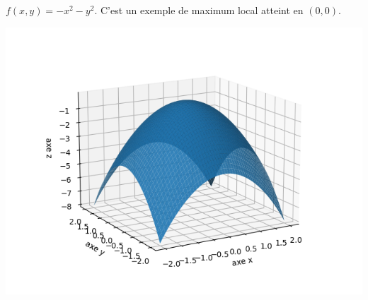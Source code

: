 \begin{exemple}{}{}
$f(x,y) = -x^2 - y^2$. C'est un exemple de maximum local atteint en $(0,0)$.


\begin{center}
\includegraphics[scale=\myscale,scale=0.5]{figures/fonctions-extrem-2a}
\end{center}

	
\end{exemple}

